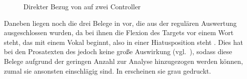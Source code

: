 \begin{figure}
\caption{Direkter Bezug von  auf zwei Controller}
\label{fig:beid2coordncao1_1}
\end{figure}

Daneben liegen noch die drei Belege in  vor, die aus
der regulären Auswertung ausgeschlossen wurden, da bei ihnen die Flexion des
Targets vor einem Wort steht, das mit einem Vokal beginnt, also in einer
Hiatusposition steht \autocites[vgl.][90--91]{askedal1973}[191--193,
201]{gjelsten1980}. Dies hat bei den Prosatexten des \CAO{} jedoch
keine große Auswirkung (vgl.~), sodass diese Belege
aufgrund der geringen Anzahl zur Analyse hinzugezogen werden können, zumal sie
ansonsten einschlägig sind. In  erscheinen sie grau
gedruckt.

